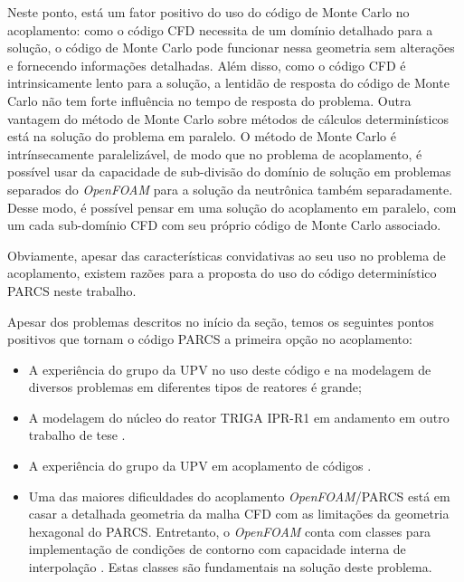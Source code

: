 \documentclass[12pt,openright,twoside,a4paper,english,french,spanish,brazil]{abntex2}
\begin{document}
Neste ponto, está um fator positivo do uso do código de Monte Carlo no acoplamento: como 
o código CFD necessita de um domínio detalhado para a solução, o código de Monte Carlo pode 
funcionar nessa geometria sem alterações e fornecendo informações detalhadas. Além disso, 
como o código CFD é intrinsicamente lento para a solução, a lentidão de resposta do código 
de Monte Carlo não tem forte influência no tempo de resposta do problema. Outra vantagem 
do método de Monte Carlo sobre métodos de cálculos determinísticos está na solução 
do problema em paralelo. O método de Monte Carlo é intrínsecamente paralelizável, de modo 
que no problema de acoplamento, é possível usar da capacidade de sub-divisão do domínio de 
solução em problemas separados do \textit{OpenFOAM} para a solução da neutrônica também 
separadamente. Desse modo, é possível pensar em uma solução do acoplamento em paralelo, 
com um cada sub-domínio CFD com seu próprio código de Monte Carlo associado.

Obviamente, apesar das características convidativas ao seu uso no problema de acoplamento, 
existem razões para a proposta do uso do código determinístico PARCS neste trabalho.

Apesar dos problemas descritos no início da seção, temos os seguintes pontos positivos 
que tornam o código PARCS a primeira opção no acoplamento:

\begin{itemize}
\item A experiência do grupo da UPV no uso deste código e na modelagem de diversos 
problemas em diferentes tipos de reatores é grande;

\item A modelagem do núcleo do reator TRIGA IPR-R1 em andamento em outro trabalho de tese \cite{Reis2013}.

\item A experiência do grupo da UPV em acoplamento de códigos \cite{Lazaro2013}.

\item Uma das maiores dificuldades do acoplamento \textit{OpenFOAM}/PARCS está em casar 
a detalhada geometria da malha CFD com as limitações da geometria hexagonal do PARCS. 
Entretanto, o \textit{OpenFOAM} conta com classes para implementação de condições 
de contorno com capacidade interna de interpolação \cite{OpenFOAM2013c}. Estas classes são fundamentais 
na solução deste problema.
\end{itemize}
\end{document}
